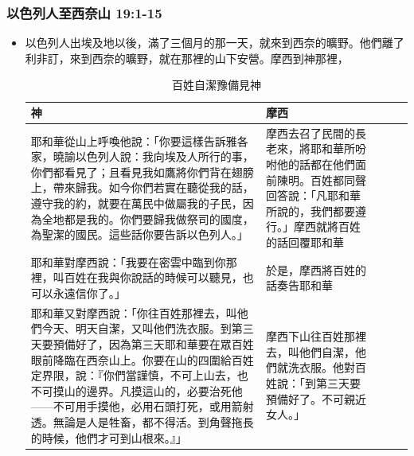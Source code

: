 \subsubsection{以色列人至西奈山 19:1-15 }
\begin{itemize} 
\itemsep-.35em
\item 以色列人出埃及地以後，滿了三個月的那一天，就來到西奈的曠野。他們離了利非訂，來到西奈的曠野，就在那裡的山下安營。摩西到神那裡，
\begin{table}[H]
\begin{threeparttable}
\begin{tabular}{@{}p{}*{4}{L{\tabcolsep\relax}}@{}}
\toprule
神 &  摩西 \\\hline
耶和華從山上呼喚他說：「你要這樣告訴雅各家，曉諭以色列人說：我向埃及人所行的事，你們都看見了；且看見我如鷹將你們背在翅膀上，帶來歸我。如今你們若實在聽從我的話，遵守我的約，就要在萬民中做屬我的子民，因為全地都是我的。你們要歸我做祭司的國度，為聖潔的國民。這些話你要告訴以色列人。」 &摩西去召了民間的長老來，將耶和華所吩咐他的話都在他們面前陳明。百姓都同聲回答說：「凡耶和華所說的，我們都要遵行。」摩西就將百姓的話回覆耶和華\tabularnewline\hline
耶和華對摩西說：「我要在密雲中臨到你那裡，叫百姓在我與你說話的時候可以聽見，也可以永遠信你了。」&於是，摩西將百姓的話奏告耶和華  \tabularnewline\hline
耶和華又對摩西說：「你往百姓那裡去，叫他們今天、明天自潔，又叫他們洗衣服。到第三天要預備好了，因為第三天耶和華要在眾百姓眼前降臨在西奈山上。你要在山的四圍給百姓定界限，說：『你們當謹慎，不可上山去，也不可摸山的邊界。凡摸這山的，必要治死他——不可用手摸他，必用石頭打死，或用箭射透。無論是人是牲畜，都不得活。到角聲拖長的時候，他們才可到山根來。』」&摩西下山往百姓那裡去，叫他們自潔，他們就洗衣服。他對百姓說：「到第三天要預備好了。不可親近女人。」 \tabularnewline
\hline
\bottomrule
\end{tabular}
\caption{百姓自潔豫備見神}
\end{threeparttable}
\end{table} 
\end{itemize}

